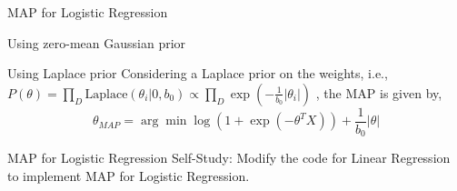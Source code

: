 \documentclass{beamer}
\begin{document}
\begin{section}{MAP for Logistic Regression}
\begin{frame}{Using zero-mean Gaussian prior}
    \end{frame}

    \begin{frame}{Using Laplace prior}
        Considering a Laplace prior on the weights, i.e., $P(\theta) = \prod_{D} \text{Laplace} (\theta_i|0, b_0) \propto \prod_{D} \exp(- \frac{1}{b_0} |\theta_i|)$
        , the MAP is given by,
        \begin{equation*}
            \theta_{MAP} = \arg \min  \log(1 + \exp(- \theta^T X)) + \frac{1}{b_0} |\theta|
        \end{equation*}
        
    \end{frame}

    \begin{frame}{MAP for Logistic Regression}
        Self-Study: Modify the code for Linear Regression to implement MAP for Logistic Regression.
    \end{frame}
    
\end{section}
\end{document}
